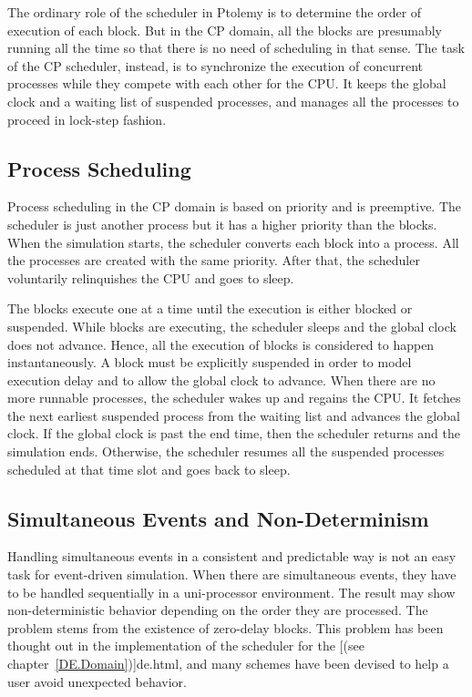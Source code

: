 The ordinary role of the scheduler in Ptolemy is to determine the order
of execution of each block.  But in the CP domain, all the blocks are
presumably running all the time so that there is no need of scheduling
in that sense.  The task of the CP scheduler, instead, is to synchronize
the execution of concurrent processes
 while they compete with each
other for the CPU.  It keeps the global clock and a waiting list of
suspended processes, and manages all the processes to proceed in
lock-step fashion.

\subsection{Process Scheduling}
\label{Process Scheduling}

Process scheduling 
in the CP domain is based on priority and is
preemptive.   The scheduler is just another process but it has a higher
priority than the blocks.  When the simulation starts, the scheduler
converts each block into a process.  All the processes are created with
the same priority.  After that, the scheduler voluntarily relinquishes
the CPU and goes to sleep.

The blocks execute one at a time until the execution is either blocked
or suspended.  While blocks are executing, the scheduler sleeps and the
global clock does not advance.  Hence, all the execution of blocks is
considered to happen instantaneously.  
A block must be explicitly suspended in order to model execution delay
and to allow the global clock to advance.
When there are no more runnable processes, the scheduler wakes up and
regains the CPU.  It fetches the
next earliest suspended process from the waiting list and advances the
global clock.  If the global clock is past the end time, then the scheduler
returns and the simulation ends.  Otherwise, the scheduler resumes all
the suspended processes scheduled at that time slot and goes back to
sleep.

\subsection{Simultaneous Events and Non-Determinism}
\label{Simultaneous Events and Non-Determinism}

Handling simultaneous events 
in a consistent and predictable way is not
an easy task for event-driven simulation.
 When there are simultaneous
events, they have to be handled sequentially in a uni-processor
environment.  The result may show non-deterministic behavior depending
on the order they are processed.  The problem stems from the existence
of zero-delay blocks.  This problem has been thought out in the
implementation of the scheduler for the
[(see chapter~\ref{DE.Domain})]{de.html},
and many schemes have been devised to
help a user avoid unexpected behavior.

